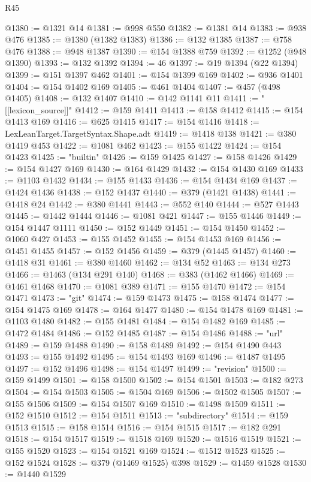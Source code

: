 \begin{lexlean}{R45}
\begin{coremodule}
@1380 := @1321 @14
@1381 := @998 @550
@1382 := @1381 @14
@1383 := @938 @476
@1385 := @1380 (@1382 @1383)
@1386 := @132 @1385
@1387 := @758 @476
@1388 := @948 @1387
@1390 := @154 @1388 @759
@1392 := @1252 (@948 @1390)
@1393 := @132 @1392
@1394 := 46
@1397 := @19 @1394 (@22 @1394)
@1399 := @151 @1397 @462
@1401 := @154 @1399 @169
@1402 := @936 @1401
@1404 := @154 @1402 @169
@1405 := @461 @1404
@1407 := @457 (@498 @1405)
@1408 := @132 @1407
@1410 := @142 @1141 @11
@1411 := "[[lexicon_source]]"
@1412 := @159 @1411
@1413 := @158 @1412
@1415 := @154 @1413 @169
@1416 := @625 @1415
@1417 := @154 @1416
@1418 := LexLeanTarget.TargetSyntax.Shape.adt
@1419 := @1418 @138
@1421 := @380 @1419 @453
@1422 := @1081 @462
@1423 := @155 @1422
@1424 := @154 @1423
@1425 := "builtin"
@1426 := @159 @1425
@1427 := @158 @1426
@1429 := @154 @1427 @169
@1430 := @164 @1429
@1432 := @154 @1430 @169
@1433 := @1103 @1432
@1434 := @155 @1433
@1436 := @154 @1434 @169
@1437 := @1424 @1436
@1438 := @152 @1437
@1440 := @379 (@1421 @1438)
@1441 := @1418 @24
@1442 := @380 @1441
@1443 := @552 @140
@1444 := @527 @1443
@1445 := @1442 @1444
@1446 := @1081 @421
@1447 := @155 @1446
@1449 := @154 @1447 @1111
@1450 := @152 @1449
@1451 := @154 @1450
@1452 := @1060 @427
@1453 := @155 @1452
@1455 := @154 @1453 @169
@1456 := @1451 @1455
@1457 := @152 @1456
@1459 := @379 (@1445 @1457)
@1460 := @1418 @31
@1461 := @380 @1460
@1462 := @134 @52
@1463 := @134 @273
@1466 := @1463 (@134 @291 @140)
@1468 := @383 (@1462 @1466)
@1469 := @1461 @1468
@1470 := @1081 @389
@1471 := @155 @1470
@1472 := @154 @1471
@1473 := "git"
@1474 := @159 @1473
@1475 := @158 @1474
@1477 := @154 @1475 @169
@1478 := @164 @1477
@1480 := @154 @1478 @169
@1481 := @1103 @1480
@1482 := @155 @1481
@1484 := @154 @1482 @169
@1485 := @1472 @1484
@1486 := @152 @1485
@1487 := @154 @1486
@1488 := "url"
@1489 := @159 @1488
@1490 := @158 @1489
@1492 := @154 @1490 @443
@1493 := @155 @1492
@1495 := @154 @1493 @169
@1496 := @1487 @1495
@1497 := @152 @1496
@1498 := @154 @1497
@1499 := "revision"
@1500 := @159 @1499
@1501 := @158 @1500
@1502 := @154 @1501
@1503 := @182 @273
@1504 := @154 @1503
@1505 := @1504 @169
@1506 := @1502 @1505
@1507 := @155 @1506
@1509 := @154 @1507 @169
@1510 := @1498 @1509
@1511 := @152 @1510
@1512 := @154 @1511
@1513 := "subdirectory"
@1514 := @159 @1513
@1515 := @158 @1514
@1516 := @154 @1515
@1517 := @182 @291
@1518 := @154 @1517
@1519 := @1518 @169
@1520 := @1516 @1519
@1521 := @155 @1520
@1523 := @154 @1521 @169
@1524 := @1512 @1523
@1525 := @152 @1524
@1528 := @379 (@1469 @1525) @398
@1529 := @1459 @1528
@1530 := @1440 @1529

\end{coremodule}
\end{lexlean}
